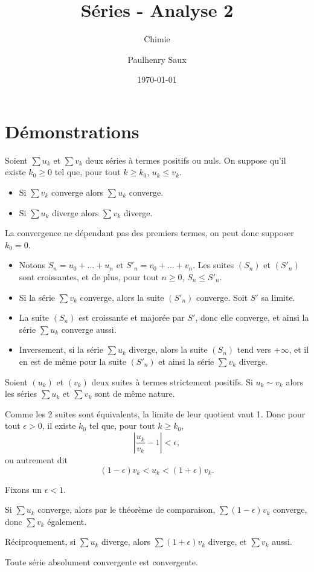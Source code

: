 \documentclass[french]{yLectureNote}
\title{Séries - Analyse 2}
\subtitle{Chimie}
\author{Paulhenry Saux}
\date{\today}
\begin{document}
\setcounter{chapter}{1}
\chapter{Démonstrations }
\begin{theorem}
Soient $\sum u_k$ et $\sum v_k$ deux séries à termes positifs ou nuls. On
suppose qu'il existe $k_0\ge 0$ tel que, pour tout $k\ge k_0$,
$u_k \le v_k$.
\begin{itemize}
\item Si $\sum v_k$ converge alors $\sum u_k$ converge.
\item Si $\sum u_k$ diverge alors $\sum v_k$ diverge.
\end{itemize}
\end{theorem}
\begin{myproof}
La convergence ne dépendant pas des
premiers termes, on peut donc supposer $k_0=0$.


\begin{itemize}
\item Notons $S_n=u_0+\dots+u_n$ et $S'_n = v_0+\dots+v_n$.
Les suites $(S_n)$ et $(S'_n)$ sont croissantes, et de plus, pour tout $n \ge 0$,
$S_n\le S'_n$.
\item Si la série $\sum v_k$ converge, alors la suite
$(S'_n)$ converge. Soit $S'$ sa limite.
 \item La suite $(S_n)$ est croissante
et majorée par $S'$, donc elle converge, et ainsi la série $\sum u_k$
converge aussi.
 \item Inversement, si la série $\sum u_k$ diverge, alors
la suite $(S_n)$ tend vers $+\infty$, et il en est de même pour la
suite $(S'_n)$ et ainsi la série $\sum v_k$ diverge.
\end{itemize}
\end{myproof}
\begin{theorem}
Soient $(u_k)$ et $(v_k)$ deux suites à termes strictement positifs.
Si $u_k \sim v_k$ alors les séries $\sum u_k$ et $\sum v_k$ sont de même nature.
\end{theorem}

\begin{myproof}
Comme les 2 suites sont équivalents, la limite de leur quotient vaut 1. Donc pour tout $\epsilon>0$, il existe $k_0$ tel que, pour
tout $k \ge k_0$,
$$\left|\frac{u_k}{v_k} -1\right| < \epsilon,$$
ou autrement dit
$$(1-\epsilon)v_k < u_k <(1+\epsilon) v_k.$$

Fixons un $\epsilon <1$.

Si $\sum u_k$ converge, alors par le théorème de comparaison,
$\sum(1-\epsilon) v_k$ converge, donc $\sum v_k$ également.

Réciproquement, si $\sum u_k$ diverge, alors
$\sum (1+\epsilon)v_k$ diverge, et $\sum v_k$ aussi.
\end{myproof}
\begin{theorem}
Toute série absolument convergente est convergente.
\end{theorem}
\end{document}
